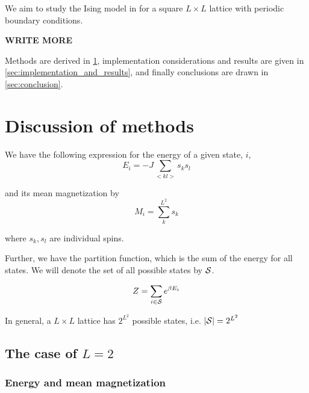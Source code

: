 \documentclass[a4paper]{article}
\begin{document}
We aim to study the Ising model in for a square $L \times L$ lattice with periodic boundary conditions.

\textbf{WRITE MORE}


Methods are derived in \ref{sec:methods}, implementation considerations and results are given in \ref{sec:implementation_and_results}, and finally conclusions are drawn in \ref{sec:conclusion}.



\section{Discussion of methods}\label{sec:methods}
We have the following expression for the energy of a given state, $i$,
\begin{equation}
    E_i=-J\sum_{< kl >}s_k s_l
\end{equation}

and its mean magnetization by
\begin{equation}
    M_i=\sum_{k}^{L^2} s_k
\end{equation}

where $s_k, s_l$ are individual spins.

Further, we have the partition function, which is the sum of the energy for all states. We will denote the set of all possible states by ${\mathcal{S}}$.

\begin{equation}
    Z = \sum_{i \in {\mathcal{S}}}e^{\beta E_i}
\end{equation}

In general, a $L \times L$ lattice has $2^{L^2}$ possible states, i.e. $|{\mathcal{S}}| = 2^{L^2}$

\subsection{The case of $L = 2$}

\subsubsection{Energy and mean magnetization}
\end{document}
